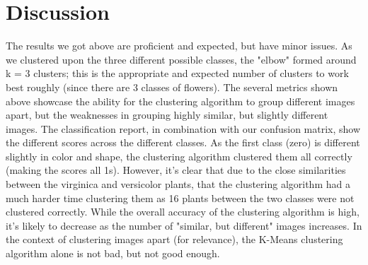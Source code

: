\documentclass[10pt,twocolumn]{article}
\begin{document}
\section {Discussion}



The results we got above are proficient and expected, but have minor issues. As we clustered upon the three different possible classes, the "elbow" formed around k = 3 clusters; this is the appropriate and expected number of clusters to work best roughly (since there are 3 classes of flowers). The several metrics shown above showcase the ability for the clustering algorithm to group different images apart, but the weaknesses in grouping highly similar, but slightly different images. The classification report, in combination with our confusion matrix, show the different scores across the different classes. As the first class (zero) is different slightly in color and shape, the clustering algorithm clustered them all correctly (making the scores all 1s). However, it's clear that due to the close similarities between the virginica and versicolor plants, that the clustering algorithm had a much harder time clustering them as 16 plants between the two classes were not clustered correctly. While the overall accuracy of the clustering algorithm is high, it's likely to decrease as the number of "similar, but different" images increases. In the context of clustering images apart (for relevance), the K-Means clustering algorithm alone is not bad, but not good enough.

\end{document}
